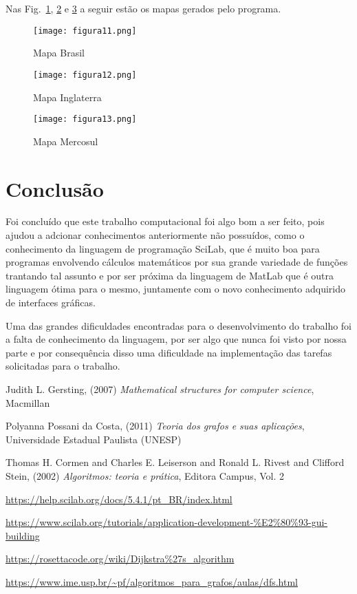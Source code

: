 \newpage
Nas Fig.~\ref{fig11}, \ref{fig12} e \ref{fig13} a seguir estão os mapas gerados pelo programa.

\begin{figure}[!htb]
\centering
\texttt{[image: figura11.png]}
%
\caption{Mapa Brasil}
\label{fig11}
\end{figure}

\begin{figure}[!htb]
\centering
\texttt{[image: figura12.png]}
%
\caption{Mapa Inglaterra}
\label{fig12}
\end{figure}

\begin{figure}[!htb]
\centering
\texttt{[image: figura13.png]}
%
\caption{Mapa Mercosul}
\label{fig13}
\end{figure}

\newpage
\section{Conclusão}
Foi concluído que este trabalho computacional foi algo bom a ser feito, pois ajudou a adcionar conhecimentos anteriormente não possuídos, como o conhecimento da linguagem de programação SciLab, que é muito boa para programas envolvendo cálculos matemáticos por sua grande variedade de funções trantando tal assunto e por ser próxima da linguagem de MatLab que é outra linguagem ótima para o mesmo, juntamente com o novo conhecimento adquirido de interfaces gráficas.

Uma das grandes dificuldades encontradas para o desenvolvimento do trabalho foi a falta de conhecimento da linguagem, por ser algo que nunca foi visto por nossa parte e por consequência disso uma dificuldade na implementação das tarefas solicitadas para o trabalho.

\begin{thebibliography}{}
\footnotesize
{}Judith L. Gersting, (2007)  {\em Mathematical structures for computer science}, Macmillan

Polyanna Possani da Costa, (2011) {\em Teoria dos grafos e suas aplica{\c{c}}{\~o}es}, Universidade Estadual Paulista (UNESP)

 Thomas H. Cormen and Charles E. Leiserson and Ronald L. Rivest and Clifford Stein, (2002) {\em Algoritmos: teoria e pr{\'a}tica}, Editora Campus, Vol. 2

\url{https://help.scilab.org/docs/5.4.1/pt_BR/index.html} 

\url{https://www.scilab.org/tutorials/application-development-\%E2\%80\%93-gui-building} 

\url{https://rosettacode.org/wiki/Dijkstra\%27s_algorithm}

\url{https://www.ime.usp.br/~pf/algoritmos_para_grafos/aulas/dfs.html}
\end{thebibliography}